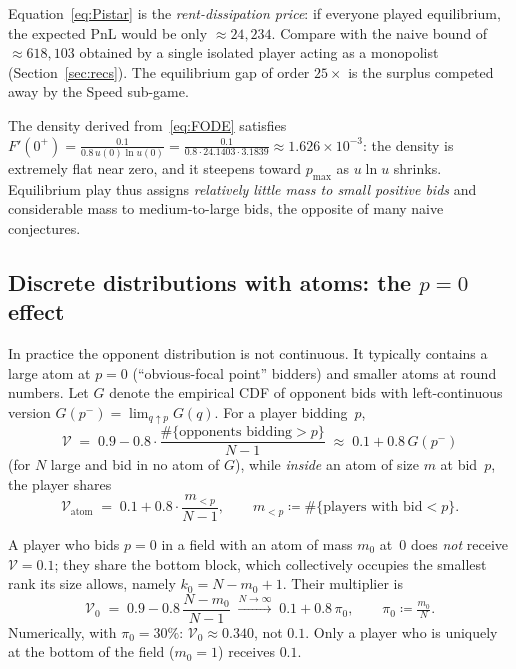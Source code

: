 \documentclass[11pt,a4paper]{article}
\theoremstyle{definition}
\theoremstyle{remark}
\newcommand{\Sp}{\mathcal{V}}
\begin{document}
\begin{warnbox}
Equation~\eqref{eq:Pistar} is the \emph{rent-dissipation price}: if everyone
played equilibrium, the expected PnL would be only \(\approx 24{,}234\). Compare
with the naive bound of \(\approx 618{,}103\) obtained by a single isolated
player acting as a monopolist (Section~\ref{sec:recs}). The equilibrium gap of
order \(25\times\) is the surplus competed away by the Speed sub-game.
\end{warnbox}

The density derived from~\eqref{eq:FODE} satisfies
\(F'(0^+)=\frac{0.1}{0.8\,u(0)\ln u(0)}
=\frac{0.1}{0.8\cdot 24.1403\cdot 3.1839}\approx 1.626\times 10^{-3}\):
the density is extremely flat near zero, and it steepens toward \(p_{\max}\) as
\(u\ln u\) shrinks. Equilibrium play thus assigns \emph{relatively little mass
to small positive bids} and considerable mass to medium-to-large bids, the
opposite of many naive conjectures.

\subsection{Discrete distributions with atoms: the \(p=0\) effect}
\label{sec:atom}

In practice the opponent distribution is not continuous. It typically contains
a large atom at \(p=0\) (``obvious-focal point'' bidders) and smaller atoms at
round numbers. Let \(G\) denote the empirical CDF of opponent bids with
left-continuous version \(G(p^{-})=\lim_{q\uparrow p}G(q)\). For a player
bidding~\(p\),
\begin{equation}\label{eq:Vgeneral}
\Sp \;=\; 0.9 - 0.8\cdot\frac{\#\{\text{opponents bidding}>p\}}{N-1}
\;\approx\;0.1 + 0.8\,G(p^{-})
\end{equation}
(for \(N\) large and bid in no atom of \(G\)),
while \emph{inside} an atom of size \(m\) at bid~\(p\), the player shares
\begin{equation}\label{eq:Vatom}
\Sp_{\text{atom}} \;=\; 0.1 + 0.8\cdot\frac{m_{<p}}{N-1},
\qquad m_{<p}\coloneqq\#\{\text{players with bid}<p\}.
\end{equation}

\begin{keybox}
A player who bids \(p=0\) in a field with an atom of mass \(m_0\) at~\(0\)
does \emph{not} receive \(\Sp=0.1\); they share the bottom block, which
collectively occupies the smallest rank its size allows, namely
\(k_0=N-m_0+1\). Their multiplier is
\[
\Sp_0 \;=\; 0.9-0.8\,\frac{N-m_0}{N-1}\;\xrightarrow{N\to\infty}\;0.1+0.8\,\pi_0,
\qquad \pi_0\coloneqq\tfrac{m_0}{N}.
\]
Numerically, with \(\pi_0=30\%\): \(\Sp_0\approx 0.340\), not \(0.1\). Only a
player who is uniquely at the bottom of the field (\(m_0=1\)) receives \(0.1\).
\end{keybox}
\end{document}
